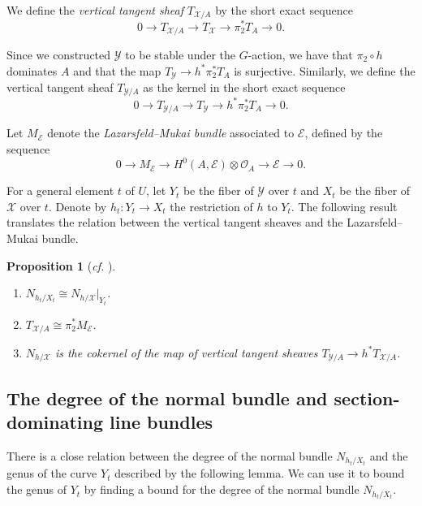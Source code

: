 \documentclass[11pt]{amsart}
\numberwithin{equation}{section}
\newtheorem{proposition}[theorem]{Proposition}
\theoremstyle{definition}
\theoremstyle{remark}
\newcommand{\cO}{\mathcal{O}}
\begin{document}
We define the \textit{vertical tangent sheaf} $T_{\mathcal{X}/A}$ by the short exact sequence
\[ 0\longrightarrow T_{\mathcal{X}/A}\longrightarrow T_{\mathcal{X}} \longrightarrow \pi_2^*T_A \longrightarrow 0. \]

Since we constructed $\mathcal{Y}$ to be stable under the $G$-action, we have that $\pi_2\circ h$ dominates $A$ and that the map $T_{\mathcal{Y}}\to h^*\pi_2^*T_A$ is surjective. Similarly, we define the vertical tangent sheaf $T_{\mathcal{Y}/A}$ as the kernel in the short exact sequence
\[ 0\longrightarrow T_{\mathcal{Y}/A}\longrightarrow T_{\mathcal{Y}} \longrightarrow h^*\pi_2^*T_A \longrightarrow 0. \]

Let $M_{\mathcal{E}}$ denote the \textit{Lazarsfeld--Mukai bundle} associated to $\mathcal{E}$, defined by the sequence
\begin{equation*}
0\longrightarrow M_{\mathcal{E}} \longrightarrow H^0(A,\mathcal{E})\otimes \cO_A \longrightarrow \mathcal{E} \longrightarrow 0.
\end{equation*}

For a general element $t$ of $U$, let $Y_t$ be the fiber of $\mathcal{Y}$ over $t$ and $X_t$ be the fiber of $\mathcal{X}$ over $t$. Denote by $h_t\colon Y_t\to X_t$ the restriction of $h$ to $Y_t$. The following result translates the relation between the vertical tangent sheaves and the Lazarsfeld--Mukai bundle.

\begin{proposition}[\textit{cf.} {\cite[Proposition 2.1]{CR19}}]\label{CR19Prop2.1}\leavevmode
\begin{enumerate}
    \item $N_{h_t/X_t}\cong N_{h/\mathcal{X}}|_{Y_t}$.
    \item $T_{\mathcal{X}/A}\cong \pi_2^* M_{\mathcal{E}}$.
    \item $N_{h/\mathcal{X}}$ is the cokernel of the map of vertical tangent sheaves $T_{\mathcal{Y}/A}\to h^*T_{\mathcal{X}/A}$.
\end{enumerate}
\end{proposition}

\subsection{The degree of the normal bundle and section-dominating line bundles}

There is a close relation between the degree of the normal bundle $N_{h_t/X_t}$ and the genus of the curve $Y_t$ described by the following lemma. We can use it to bound the genus of $Y_t$ by finding a bound for the degree of the normal bundle $N_{h_t/X_t}$.
\end{document}
